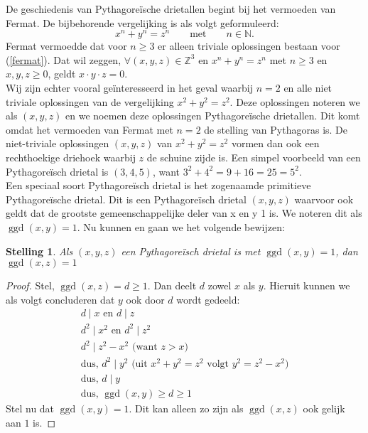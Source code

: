 \documentclass[12pt,reqno]{article}
\newcommand*{\NN}{\ensuremath{\mathbb{N}}}
\newcommand*{\ZZ}{\ensuremath{\mathbb{Z}}}
\theoremstyle{theorem}
\newtheorem{theorem}{Stelling}
\theoremstyle{definition}
\DeclareMathOperator{\ggd}{ggd}
\begin{document}
	De geschiedenis van Pythagore\"ische drietallen begint bij het vermoeden van Fermat. De bijbehorende vergelijking is als volgt geformuleerd:
	\begin{equation}\label{fermat}
		x^n + y^n = z^n \qquad \text{met} \qquad n \in \NN.
	\end{equation}
	Fermat vermoedde dat voor $n \geq 3$ er alleen triviale oplossingen bestaan voor (\ref{fermat}). Dat wil zeggen, $\forall (x,y,z) \in \ZZ^3$ en $x^n + y^n = z^n$ met $n \geq 3$ en $x, y, z \geq 0$, geldt $x \cdot y \cdot z = 0$. \\
	Wij zijn echter vooral ge\"interesseerd in het geval waarbij $n=2$ en alle niet triviale oplossingen van de vergelijking $x^2 + y^2 = z^2$. Deze oplossingen noteren we als $(x,y,z)$ en we noemen deze oplossingen Pythagore\"ische drietallen. Dit komt omdat het vermoeden van Fermat met $n=2$ de stelling van Pythagoras is. De niet-triviale oplossingen $(x,y,z)$ van $x^2 + y^2 = z^2$ vormen dan ook een rechthoekige driehoek waarbij $z$ de schuine zijde is. Een simpel voorbeeld van een Pythagore\"isch drietal is $(3,4,5)$, want $3^2 + 4^2 = 9 + 16 = 25 = 5^2$. \\
	Een speciaal soort Pythagore\"isch drietal is het zogenaamde primitieve \mbox{Pythagore\"ische} drietal. Dit is een Pythagore\"isch drietal $(x,y,z)$ waarvoor ook geldt dat de grootste gemeenschappelijke deler van x en y 1 is. We noteren dit als $\ggd(x,y) = 1$. Nu kunnen en gaan we het volgende bewijzen:
	\begin{theorem}
		Als $(x,y,z)$ een Pythagore\"isch drietal is met $\ggd(x,y) = 1$, dan $\ggd(x,z) = 1$
	\end{theorem}
	\begin{proof}
	Stel, $\ggd(x,z) = d \geq 1$. Dan deelt $d$ zowel $x$ als $y$. Hieruit kunnen we als volgt concluderen dat $y$ ook door $d$ wordt gedeeld:
	\begin{align*}
	d\mid x \text{ en } d\mid z \\
	d^2\mid x^2 \text{ en } d^2 \mid z^2 \\
	d^2\mid z^2 - x^2 \text{ (want } z>x \text{)} \\
	\text{dus, } d^2 \mid y^2 \text{ (uit $x^2 + y^2 = z^2$ volgt $y^2 = z^2 - x^2$)} \\
	\text{dus, } d \mid y \\
	\text{dus, } \ggd(x, y) \geq d \geq 1
	\end{align*}
	Stel nu dat $\ggd(x, y) = 1$. Dit kan alleen zo zijn als $\ggd(x, z) $ ook gelijk aan $1$ is. 
	\end{proof}	
\end{document}
